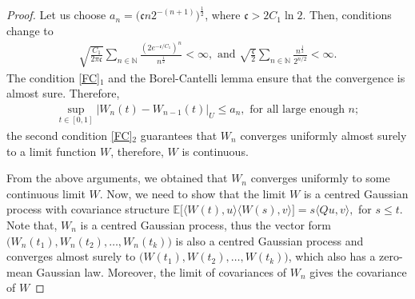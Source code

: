 \documentclass[english,a4paper,11pt]{amsart}
\theoremstyle{plain}
\theoremstyle{definition}
\theoremstyle{remark}
\numberwithin{equation}{section}
\newcommand{\N}{\mathbb{N}}
\begin{document}
\begin{appendix}
\begin{proof}
%
%
Let us choose $a_n= \big(\mathfrak{c}n2^{-(n+1)}\big)^{\frac{1}{2}}$, where $\mathfrak{c}>2C_1\ln 2$. Then, conditions change to
\begin{align*}
	\sqrt{\frac{C_1}{2\pi\mathfrak{c}}}\sum_{n\in\N}\frac{(2e^{-\mathfrak{c}/C_1})^n}{n^{\frac{1}{2}}}<\infty, \text{ and }\sqrt{\frac{\mathfrak{c}}{2}}\sum_{n\in\N} \frac{n^{\frac{1}{2}}}{2^{n/2}}<\infty.
\end{align*}
%
The condition \eqref{FC}$_1$ and the Borel-Cantelli lemma ensure that the convergence is almost sure. Therefore, 
\begin{align*}
	\sup_{t\in[0,1]}|W_n(t)-W_{n-1}(t)|_U\leq a_n, \text{ for all large enough }n;
\end{align*}the second condition \eqref{FC}$_2$ guarantees that $W_n$ converges uniformly almost surely to a limit function $W$, therefore, $W$ is continuous.

 From the above arguments, we obtained that $W_n$ converges uniformly to some continuous limit  $W$. Now, we need to show that the limit $W$ is a centred Gaussian process with covariance structure $\mathbb{E}\big[\langle W(t),u\rangle \langle W(s),v\rangle\big]=s\langle Q u,v\rangle,$ for $s\leq t$. Note that, $W_n$ is a centred Gaussian process, thus the vector form $\big(W_n(t_1), W_n(t_2),\dots,W_n(t_k)\big)$ is also a centred Gaussian process and converges almost surely to $\big(W(t_1), W(t_2),\dots,W(t_k)\big)$, which also has a zero-mean Gaussian law. Moreover, the limit of covariances of $W_n$ gives the covariance of $W$
 

\end{proof}
\end{appendix}
\end{document}
